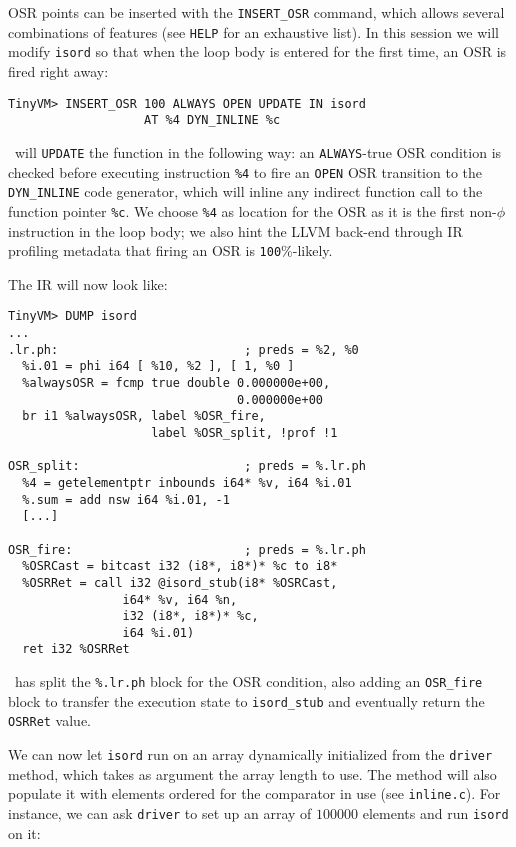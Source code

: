 OSR points can be inserted with the {\tt INSERT\_OSR} command, which allows several combinations of features (see {\tt HELP} for an exhaustive list). In this session we will modify {\tt isord} so that when the loop body is entered for the first time, an OSR is fired right away:

\begin{small}
\begin{verbatim}
TinyVM> INSERT_OSR 100 ALWAYS OPEN UPDATE IN isord
                   AT %4 DYN_INLINE %c
\end{verbatim}
\end{small}

\noindent \tinyvm\ will {\tt UPDATE} the function in the following way: an {\tt ALWAYS}-true OSR condition is checked before executing instruction {\tt \%4} to fire an {\tt OPEN} OSR transition to the {\tt DYN\_INLINE} code generator, which will inline any indirect function call to the function pointer {\tt \%c}. We choose {\tt \%4} as location for the OSR as it is the first non-$\phi$ instruction in the loop body; we also hint the LLVM back-end through IR profiling metadata that firing an OSR is {\tt 100}\%-likely.

The IR will now look like:

\begin{small}
\begin{verbatim}
TinyVM> DUMP isord
...
.lr.ph:                          ; preds = %2, %0
  %i.01 = phi i64 [ %10, %2 ], [ 1, %0 ]
  %alwaysOSR = fcmp true double 0.000000e+00,
                                0.000000e+00
  br i1 %alwaysOSR, label %OSR_fire,
                    label %OSR_split, !prof !1

OSR_split:                       ; preds = %.lr.ph
  %4 = getelementptr inbounds i64* %v, i64 %i.01
  %.sum = add nsw i64 %i.01, -1
  [...]

OSR_fire:                        ; preds = %.lr.ph
  %OSRCast = bitcast i32 (i8*, i8*)* %c to i8*
  %OSRRet = call i32 @isord_stub(i8* %OSRCast,
                i64* %v, i64 %n,
                i32 (i8*, i8*)* %c,
                i64 %i.01)
  ret i32 %OSRRet
\end{verbatim}
\end{small}

\noindent\osrkit\ has split the {\tt \%.lr.ph} block for the OSR condition, also adding an {\tt OSR\_fire} block to transfer the execution state to {\tt isord\_stub} and eventually return the {\tt OSRRet} value. 

We can now let {\tt isord} run on an array dynamically initialized from the {\tt driver} method, which takes as argument the array length to use. The method will also populate it with elements ordered for the comparator in use (see {\small\tt inline.c}). For instance, we can ask {\tt driver} to set up an array of $100000$ elements and run {\tt isord} on it:

